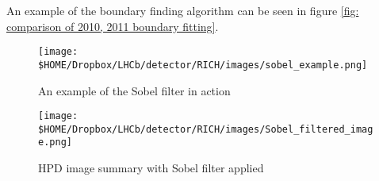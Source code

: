 An example of the boundary finding algorithm can be seen in figure \ref{fig: comparison of 2010, 2011 boundary fitting}.

\begin{figure}[h]
	\begin{center}
		\texttt{[image: \$HOME/Dropbox/LHCb/detector/RICH/images/sobel\_example.png]}
		\caption{An example of the Sobel filter in action}
		\label{fig: sobel example}
	\end{center}
\end{figure}

\begin{figure}[h]
	\begin{center}
		\texttt{[image: \$HOME/Dropbox/LHCb/detector/RICH/images/Sobel\_filtered\_image.png]}
		\caption{HPD image summary with Sobel filter applied}
		\label{fig: HPD image with Sobel filter applied}
	\end{center}
\end{figure}

%


